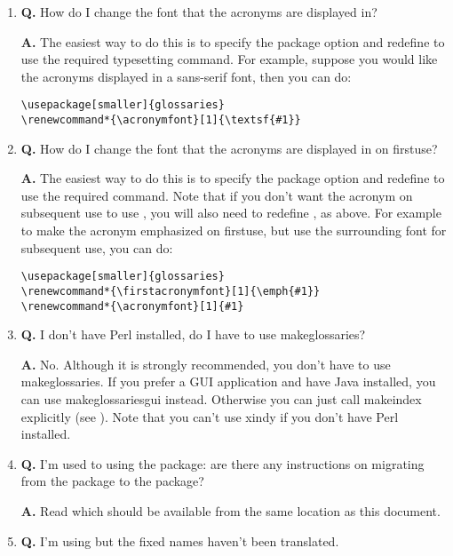 \documentclass[report]{nlctdoc}
\newcommand*{\firstuse}{\gls{firstuse}}
\begin{document}
\begin{enumerate}
\item \textbf{Q.} How do I change the font that the acronyms are displayed in?

\textbf{A.} The easiest way to do this is to specify the  package
option and redefine  to use the required typesetting
command.  For example, suppose you would like the acronyms displayed in 
a sans-serif font, then you can do:
\begin{verbatim}
\usepackage[smaller]{glossaries}
\renewcommand*{\acronymfont}[1]{\textsf{#1}}
\end{verbatim}

\item \textbf{Q.} How do I change the font that the acronyms are displayed in
on \firstuse?

\textbf{A.} The easiest way to do this is to specify the  package
option and redefine  to use the required 
command. Note that if you don't want the acronym on subsequent use
to use , you will also need to redefine ,
as above. For example to make the acronym emphasized on 
\firstuse, but use the surrounding font for subsequent use, you can do:
\begin{verbatim}
\usepackage[smaller]{glossaries}
\renewcommand*{\firstacronymfont}[1]{\emph{#1}}
\renewcommand*{\acronymfont}[1]{#1}
\end{verbatim}

\item \textbf{Q.} I don't have Perl installed, do I have to use 
\gls{makeglossaries}?

\textbf{A.} No. Although it is strongly recommended, you don't have to
use \gls{makeglossaries}. If you prefer a GUI application and have
Java installed, you can use \gls{makeglossariesgui} instead.
Otherwise you can just call \gls{makeindex} explicitly (see
). Note that you can't use \gls{xindy}
if you don't have Perl installed.

\item \textbf{Q.} I'm used to using the  package: are there any
instructions on migrating from the  package to the
 package?

\textbf{A.} Read  which should be
available from the same location as this document.

\item \textbf{Q.} I'm using  but the fixed names haven't
been translated.


\end{enumerate}
\end{document}
